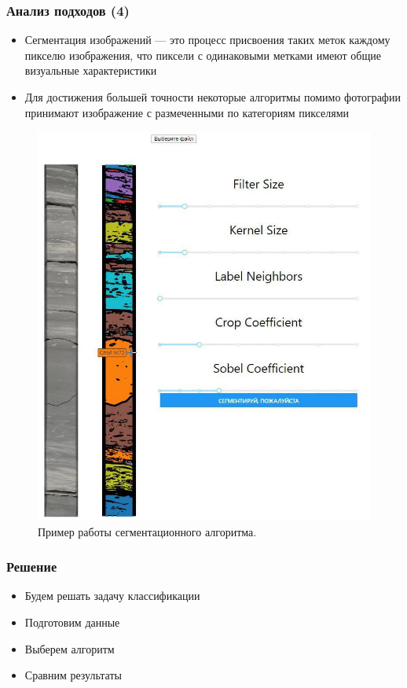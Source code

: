 \documentclass[xetex,mathserif,serif]{beamer}
\begin{document}
	
	\begin{frame}
		\frametitle{Анализ подходов (4)}
		
        \begin{itemize}
            \item Сегментация изображений — это процесс присвоения таких меток каждому пикселю изображения, что пиксели с одинаковыми метками имеют общие визуальные характеристики
            \item Для достижения большей точности некоторые алгоритмы помимо фотографии принимают изображение с размеченными по категориям пикселями
        \end{itemize} 
        
        \begin{figure}[h]
            \centering
            \includegraphics[scale=0.15]{images/segmentation.jpg}
            \caption{Пример работы сегментационного алгоритма.}
            \label{segmentation}
        \end{figure}        
        
	\end{frame}		


	\begin{frame}
		\frametitle{Решение}
		
        \begin{itemize}
            \item Будем решать задачу классификации
            \item Подготовим данные
            \item Выберем алгоритм
            \item Сравним результаты
        \end{itemize} 
        
	\end{frame}	
\end{document}
